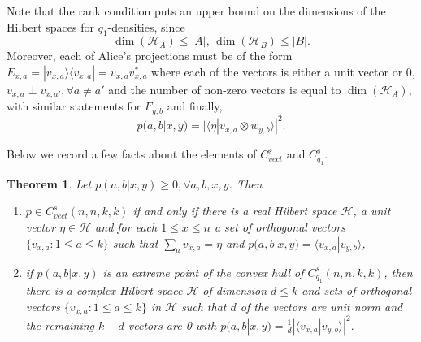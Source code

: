 \documentclass[11pt]{amsart}
\newtheorem{thm}{Theorem}[section]
\theoremstyle{definition}
\newcommand{\cl}[1]{\mathcal{#1}}
\begin{document}
 Note that the rank condition puts an upper bound on the dimensions of the Hilbert spaces for $q_1$-densities, since
 \[ \dim(\cl H_A) \le |A|, \, \dim(\cl H_B) \le |B|.\]
 Moreover, each of Alice's projections must  be of the form $E_{x,a} = |v_{x,a}\rangle \langle v_{x,a} | = v_{x,a} v_{x,a}^*$ where each of the vectors is either a unit vector or 0, $v_{x,a} \perp v_{x,a'}, \forall a \ne a'$ and the number of non-zero vectors is equal to $\dim(\cl H_A)$, with similar statements for $F_{y,b}$ and finally,
 \[ p(a,b|x,y) = | \langle \eta | v_{x,a} \otimes w_{y,b} \rangle |^2.\]

 Below we record a few facts about the elements of $C_{vect}^s$ and $C_{q_1}^s$.
 
 \begin{thm} Let $p(a,b|x,y) \ge 0, \forall a,b,x,y$.  Then
 \begin{enumerate}
 \item $p \in C_{vect}^s(n,n,k,k)$ if and only if there is a real Hilbert space $\cl H$, a unit vector $\eta \in \cl H$ and for each $1 \le x \le n$ a set of orthogonal vectors $\{ v_{x,a}: 1 \le a \le k \}$ such that $\sum_a v_{x,a} = \eta$ and $p(a,b|x,y) = \langle v_{x,a} | v_{y,b} \rangle$,
 \item  if $p(a,b|x,y)$ is an extreme point of the convex hull of $C_{q_1}^s(n,n,k,k)$, then there is a complex Hilbert space $\cl H$ of dimension $d \le k$ and sets of orthogonal vectors $\{ v_{x,a} : 1 \le a \le k \}$ in $\cl H$ such that $d$ of the vectors are unit norm and the remaining $k-d$ vectors are 0
 with $p(a,b|x,y) =\frac{1}{d} | \langle v_{x,a} | v_{y,b} \rangle |^2.$
 \end{enumerate}
 \end{thm}
\end{document}
